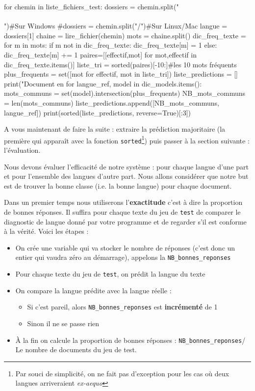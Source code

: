 \begin{python}
for chemin in liste_fichiers_test:
  dossiers = chemin.split("\\\\")#Sur Windows
  #dossiers = chemin.split("/")#Sur Linux/Mac
  langue = dossiers[1]
  chaine = lire_fichier(chemin)
  mots = chaine.split()
  dic_freq_texte = {}
  for m in mots:
    if m not in dic_freq_texte:
      dic_freq_texte[m] = 1
    else:
      dic_freq_texte[m] += 1
  paires=[[effectif,mot] for mot,effectif in  dic_freq_texte.items()]
  liste_tri = sorted(paires)[-10:]#les 10 mots fréquents
  plus_frequents = set([mot for effectif, mot in liste_tri])
  liste_predictions = []
  print("Document en %
  for langue_ref, model in dic_models.items():
    mots_communs = set(model).intersection(plus_frequents)
    NB_mots_communs = len(mots_communs)
    liste_predictions.append([NB_mots_communs, langue_ref])
    print(sorted(liste_predictions, reverse=True)[:3])
\end{python}

A vous maintenant de faire la suite : extraire la prédiction majoritaire (la première qui apparaît avec la fonction \texttt{sorted}\footnote{Par souci de simplicité, on ne fait pas d'exception pour les cas où deux langues arriveraient \textit{ex-aequo} }) puis passer à la section suivante : l'évaluation.

\vspace{0.5cm}
\vspace{0.5cm}

 Nous devons évaluer l'efficacité de notre système : pour chaque langue d'une part et pour l'ensemble des langues d'autre part.
 Nous allons considérer que notre but est de trouver la bonne classe (i.e. la bonne langue) pour chaque document.

Dans un premier temps nous utiliserons l'\textbf{exactitude} c'est à dire la proportion de bonnes réponses. Il suffira pour chaque texte du jeu de \texttt{test} de comparer le diagnostic de langue donné par votre programme et de regarder s'il est conforme à la vérité. Voici les étapes :

 \begin{itemize}
 \item On crée une variable qui va stocker le nombre de réponses (c'est donc un entier qui vaudra zéro au démarrage), appelons la \texttt{NB\_bonnes\_reponses}
 \item Pour chaque texte du jeu de \texttt{test}, on prédit la langue du texte
 \item On compare la langue prédite avec la langue réelle :
 \begin{itemize}
 \item Si c'est pareil, alors \texttt{NB\_bonnes\_reponses} est \textbf{incrémenté} de 1
 \item Sinon il ne se passe rien
 \end{itemize}
 \item À la fin on calcule la proportion de bonnes réponses : \texttt{NB\_bonnes\_reponses}/ Le nombre de documents du jeu de test.
 \end{itemize}


